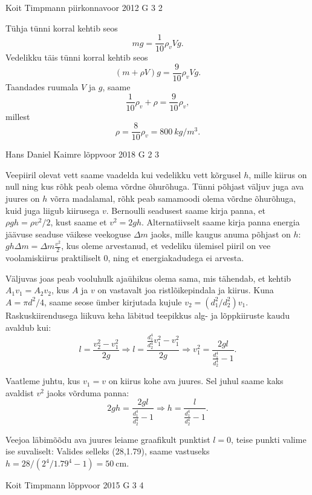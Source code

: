 \documentclass[11pt, twoside]{article}
\begin{document}
{%
{Koit Timpmann} %
{piirkonnavoor} %
{2012} %
{G 3} %
{2} %
{

\ifSolution
Tühja tünni korral kehtib seos
\[
mg=\frac 1{10}\rho_vVg.
\]
Vedelikku täis tünni korral kehtib seos	
\[
(m+\rho V)g=\frac 9{10}\rho_vVg.
\]
Taandades ruumala $V$ ja $g$, saame
\[
\frac 1{10}\rho_v+\rho=\frac 9{10}\rho_v,
\]
millest 
\[
\rho=\frac 8{10}\rho_v = \SI{800}{kg/m^3}.
\]
\fi
}

{Hans Daniel Kaimre} %
{lõppvoor} %
{2018} %
{G 2} %
{3} %
{

\ifSolution
Veepiiril olevat vett saame vaadelda kui vedelikku vett kõrgusel $h$, mille kiirus on null ning kus rõhk peab olema võrdne õhurõhuga. Tünni põhjast väljuv juga ava juures on $h$ võrra madalamal, rõhk peab samamoodi olema võrdne õhurõhuga, kuid juga liigub kiirusega $v$. Bernoulli seadusest saame kirja panna, et $\rho g h = \rho v^2/2$, kust saame et $v^2=2gh$. Alternatiivselt saame kirja panna energia jäävuse seaduse väikese veekoguse $\Delta m$ jaoks, mille kaugus anuma põhjast on $h$: $ g h \Delta m = \Delta m \frac{v^2}{2}$, kus oleme arvestanud, et vedeliku ülemisel piiril on vee voolamiskiirus praktiliselt 0, ning et energiakadudega ei arvesta. 

Väljuvas joas peab vooluhulk ajaühikus olema sama, mis tähendab, et kehtib $A_1v_1=A_2v_2$, kus $A$ ja $v$ on vastavalt joa ristlõikepindala ja kiirus. Kuna $A=\pi d^2/4$, saame seose ümber kirjutada kujule $v_2=(d_1^2/d_2^2)v_1$. Raskuskiirendusega liikuva keha läbitud teepikkus alg- ja lõppkiiruste kaudu avaldub kui:
$$l=\frac{v_2^2-v_1^2}{2g} \Rightarrow l=\frac{\frac{d_1^4}{d_2^4}v_1^2-v_1^2}{2g} \Rightarrow v_1^2=\frac{2gl}{\frac{d_1^4}{d_2^4}-1}.$$

Vaatleme juhtu, kus $v_1=v$ on kiirus kohe ava juures. Sel juhul saame kaks avaldist $v^2$ jaoks võrduma panna:
$$2gh=\frac{2gl}{\frac{d_1^4}{d_2^4}-1}\Rightarrow h=\frac{l}{\frac{d_1^4}{d_2^4}-1}.$$

Veejoa läbimõõdu ava juures leiame graafikult punktist $l=0$, teise punkti valime ise suvaliselt: Valides selleks (28,\num{1.79}), saame vastuseks $h=28/(2^4/\num{1.79}^4-1)=\SI{50}{\cm}$.
\fi
}

{Koit Timpmann} %
{lõppvoor} %
{2015} %
{G 3} %
{4} %
{

}}
\end{document}
